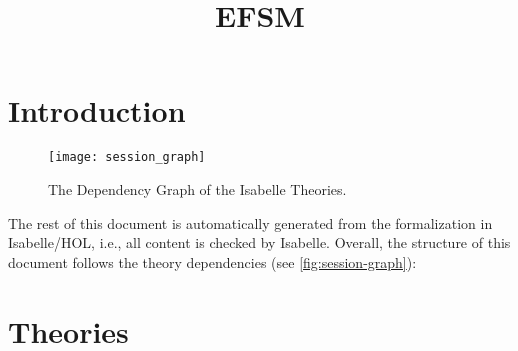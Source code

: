 \documentclass[10pt,DIV16,a4paper,abstract=true,twoside=semi,openright]{scrreprt}
\title{EFSM}
\author{%
}
\begin{document}
  \maketitle
  \begin{abstract}
    \begin{quote}
      
    \bigskip
    \end{quote}
  \end{abstract}


\tableofcontents
\cleardoublepage

\chapter{Introduction}

  \begin{figure}
    \centering
    \texttt{[image: session\_graph]}
    \caption{The Dependency Graph of the Isabelle Theories.\label{fig:session-graph}}
  \end{figure}
  The rest of this document is automatically generated from the
  formalization in Isabelle/HOL, i.e., all content is checked by
  Isabelle.  Overall, the structure of this document follows the
  theory dependencies (see \autoref{fig:session-graph}): 

\nocite{foster.ea:efsm:2018}

\clearpage
\chapter{Theories}




{\small
  
  
}
\end{document}
